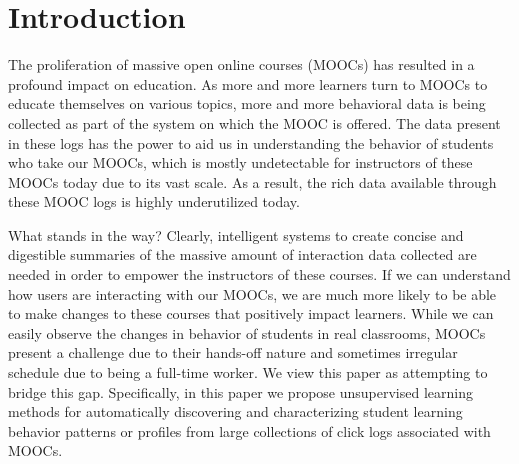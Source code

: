 \section{Introduction}
The proliferation of massive open online courses (MOOCs) has resulted in a
profound impact on education. As more and more learners turn to MOOCs to
educate themselves on various topics, more and more behavioral data is
being collected as part of the system on which the MOOC is offered. The
data present in these logs has the power to aid us in understanding the
behavior of students who take our MOOCs, which is mostly undetectable for
instructors of these MOOCs today due to its vast scale. As a result, the
rich data available through these MOOC logs is highly underutilized today.

What stands in the way? Clearly, intelligent systems to create concise and
digestible summaries of the massive amount of interaction data collected
are needed in order to empower the instructors of these courses. If we can
understand how users are interacting with our MOOCs, we are much more
likely to be able to make changes to these courses that positively impact
learners. While we can easily observe the changes in behavior of students
in real classrooms, MOOCs present a challenge due to their hands-off
nature and sometimes irregular schedule due to being a full-time worker.   
We view this paper as attempting to bridge this gap. Specifically,
in this paper we propose unsupervised learning methods for automatically
discovering and characterizing student learning behavior patterns or profiles from large
collections of click logs associated with MOOCs. 

